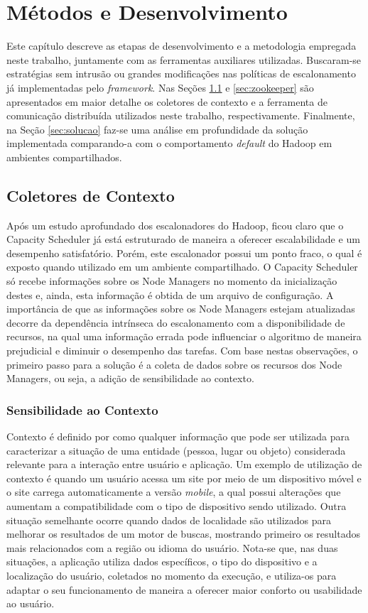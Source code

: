 \chapter{Métodos e Desenvolvimento}
\label{cap:desen}
Este capítulo descreve as etapas de desenvolvimento e a metodologia empregada neste trabalho, juntamente com as ferramentas auxiliares utilizadas. Buscaram-se estratégias sem intrusão ou grandes modificações nas políticas de escalonamento já implementadas pelo \textit{framework}. Nas Seções \ref{sec:collector} e \ref{sec:zookeeper} são apresentados em maior detalhe os coletores de contexto e a ferramenta de comunicação distribuída utilizados neste trabalho, respectivamente. Finalmente, na Seção \ref{sec:solucao} faz-se uma análise em profundidade da solução implementada comparando-a com o comportamento \textit{default} do Hadoop em ambientes compartilhados.

\section{Coletores de Contexto}
\label{sec:collector}
Após um estudo aprofundado dos escalonadores do Hadoop, ficou claro que o Capacity Scheduler já está estruturado de maneira a oferecer escalabilidade e um desempenho satisfatório. Porém, este escalonador possui um ponto fraco, o qual é exposto quando utilizado em um ambiente compartilhado. O Capacity Scheduler só recebe informações sobre os Node Managers no momento da inicialização destes e, ainda, esta informação é obtida de um arquivo de configuração. A importância de que as informações sobre os Node Managers estejam atualizadas decorre da dependência intrínseca do escalonamento com a disponibilidade de recursos, na qual uma informação errada pode influenciar o algoritmo de maneira prejudicial e diminuir o desempenho das tarefas. Com base nestas observações, o primeiro passo para a solução é a coleta de dados sobre os recursos dos Node Managers, ou seja, a adição de sensibilidade ao contexto.

\subsection{Sensibilidade ao Contexto}
\label{sec:ctx}
Contexto é definido por \citet{Dey} como qualquer informação que pode ser utilizada para caracterizar a situação de uma entidade (pessoa, lugar ou objeto) considerada relevante para a interação entre usuário e aplicação. Um exemplo de utilização de contexto é quando um usuário acessa um site por meio de um dispositivo móvel e o site carrega automaticamente a versão \textit{mobile}, a qual possui alterações que aumentam a compatibilidade com o tipo de dispositivo sendo utilizado. Outra situação semelhante ocorre quando dados de localidade são utilizados para melhorar os resultados de um motor de buscas, mostrando primeiro os resultados mais relacionados com a região ou idioma do usuário. Nota-se que, nas duas situações, a aplicação utiliza dados específicos, o tipo do dispositivo e a localização do usuário, coletados no momento da execução, e utiliza-os para adaptar o seu funcionamento de maneira a oferecer maior conforto ou usabilidade ao usuário. 

